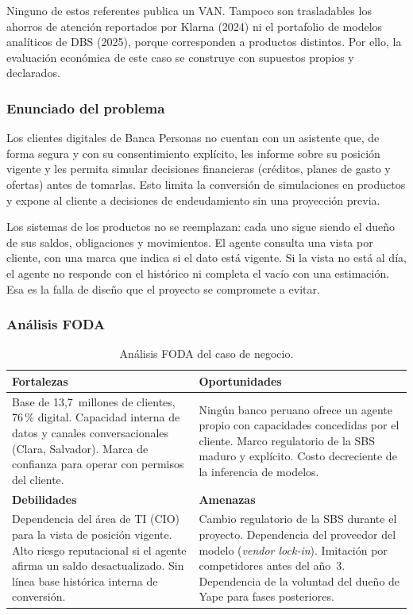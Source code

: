\documentclass[11pt,a4paper]{article}
\newcommand{\clave}[1]{%
  \par\smallskip\noindent\colorbox{suave}{\parbox{\dimexpr\textwidth-2\fboxsep\relax}{\setstretch{1.15}\small #1}}\par\smallskip}
\begin{document}
Ninguno de estos referentes publica un VAN. Tampoco son trasladables los ahorros de atención reportados por Klarna (2024) ni el portafolio de modelos analíticos de DBS (2025), porque corresponden a productos distintos. Por ello, la evaluación económica de este caso se construye con supuestos propios y declarados.

\subsubsection{Enunciado del problema}

\clave{Los clientes digitales de Banca Personas no cuentan con un asistente que, de forma segura y con su consentimiento explícito, les informe sobre su posición vigente y les permita simular decisiones financieras (créditos, planes de gasto y ofertas) antes de tomarlas. Esto limita la conversión de simulaciones en productos y expone al cliente a decisiones de endeudamiento sin una proyección previa.}

Los sistemas de los productos no se reemplazan: cada uno sigue siendo el dueño de sus saldos, obligaciones y movimientos. El agente consulta una vista por cliente, con una marca que indica si el dato está vigente. Si la vista no está al día, el agente no responde con el histórico ni completa el vacío con una estimación. Esa es la falla de diseño que el proyecto se compromete a evitar.

\subsubsection{Análisis FODA}

\begin{table}[H]
\centering
\caption{Análisis FODA del caso de negocio.}
\small
\begin{tabularx}{\textwidth}{@{}X X@{}}
\toprule
\textbf{Fortalezas} & \textbf{Oportunidades} \\
\midrule
Base de 13,7~millones de clientes, 76\,\% digital. Capacidad interna de datos y canales conversacionales (Clara, Salvador). Marca de confianza para operar con permisos del cliente. &
Ningún banco peruano ofrece un agente propio con capacidades concedidas por el cliente. Marco regulatorio de la SBS maduro y explícito. Costo decreciente de la inferencia de modelos. \\
\midrule
\textbf{Debilidades} & \textbf{Amenazas} \\
\midrule
Dependencia del área de TI (CIO) para la vista de posición vigente. Alto riesgo reputacional si el agente afirma un saldo desactualizado. Sin línea base histórica interna de conversión. &
Cambio regulatorio de la SBS durante el proyecto. Dependencia del proveedor del modelo (\textit{vendor lock-in}). Imitación por competidores antes del año~3. Dependencia de la voluntad del dueño de Yape para fases posteriores. \\
\bottomrule
\end{tabularx}
\end{table}
\end{document}

